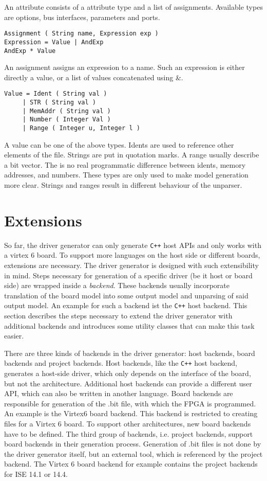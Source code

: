 \documentclass{report}
\begin{document}
An attribute consists of a attribute type and a list of assignments. Available types are options, bus interfaces, parameters and ports.

\begin{lstlisting}
Assignment ( String name, Expression exp )
Expression = Value | AndExp
AndExp * Value
\end{lstlisting}

An assignment assigns an expression to a name. Such an expression is either directly a value, or a list of values concatenated using \&. %

\begin{lstlisting}
Value = Ident ( String val )
     | STR ( String val )
     | MemAddr ( String val )
     | Number ( Integer Val )
     | Range ( Integer u, Integer l )
\end{lstlisting}

A value can be one of the above types. Idents are used to reference other elements of the file. Strings are put in quotation marks. A range usually describe a bit vector.
The is no real programmatic difference between idents, memory addresses, and numbers. These types are only used to make model generation more clear. Strings and ranges result in different behaviour of the unparser.

\section{Extensions}
So far, the driver generator can only generate \texttt{C++} host APIs and only works with a virtex 6 board. To support more languages on the host side or different boards, extensions are necessary. The driver generator is designed with such extensibility in mind. Steps necessary for generation of a specific driver (be it host or board side) are wrapped inside a \textit{backend}. These backends usually incorporate translation of the board model into some output model and unparsing of said output model. An example for such a backend ist the \texttt{C++} host backend. This section describes the steps necessary to extend the driver generator with additional backends and introduces some utility classes that can make this task easier. 

There are three kinds of backends in the driver generator: host backends, board backends and project backends.
Host backends, like the \texttt{C++} host backend, generates a host-side driver, which only depends on the interface of the board, but not the architecture. Additional host backends can provide a different user API, which can also be written in another language.
Board backends are responsible for generation of the .bit file, with which the FPGA is programmed. An example is the Virtex6 board backend. This backend is restricted to creating files for a Virtex 6 board. To support other architectures, new board backends have to be defined.
The third group of backends, i.e. project backends, support board backends in their generation process. Generation of .bit files is not done by the driver generator itself, but an external tool, which is referenced by the project backend. The Virtex 6 board backend for example contains the project backends for ISE 14.1 or 14.4.
\end{document}
